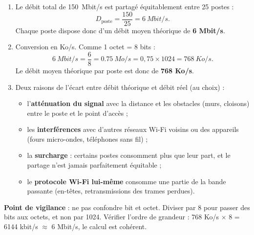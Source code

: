 \documentclass[11pt]{article}
\begin{document}
\begin{corrige}
\begin{enumerate}
  \item Le débit total de \SI{150}{Mbit/s} est partagé équitablement entre 25 postes :
  \[ D_{\text{poste}} = \dfrac{150}{25} = \SI{6}{Mbit/s}. \]
  Chaque poste dispose donc d'un débit moyen théorique de \textbf{6 Mbit/s}.
  \item Conversion en Ko/s. Comme 1 octet = 8 bits :
  \[ \SI{6}{Mbit/s} = \dfrac{6}{8} = \SI{0,75}{Mo/s} = 0,75 \times 1024 = \SI{768}{Ko/s}. \]
  Le débit moyen théorique par poste est donc de \textbf{768 Ko/s}.
  \item Deux raisons de l'écart entre débit théorique et débit réel (au choix) :
  \begin{itemize}
    \item l'\textbf{atténuation du signal} avec la distance et les obstacles (murs, cloisons) entre le poste et le point d'accès ;
    \item les \textbf{interférences} avec d'autres réseaux Wi-Fi voisins ou des appareils (fours micro-ondes, téléphones sans fil) ;
    \item la \textbf{surcharge} : certains postes consomment plus que leur part, et le partage n'est jamais parfaitement équitable ;
    \item le \textbf{protocole Wi-Fi lui-même} consomme une partie de la bande passante (en-têtes, retransmissions des trames perdues).
  \end{itemize}
\end{enumerate}
\textbf{Point de vigilance} : ne pas confondre bit et octet. Diviser par 8 pour passer des bits aux octets, et non par 1024. Vérifier l'ordre de grandeur : 768 Ko/s $\times$ 8 = 6144 kbit/s $\approx$ 6 Mbit/s, le calcul est cohérent.
\end{corrige}
\end{document}
